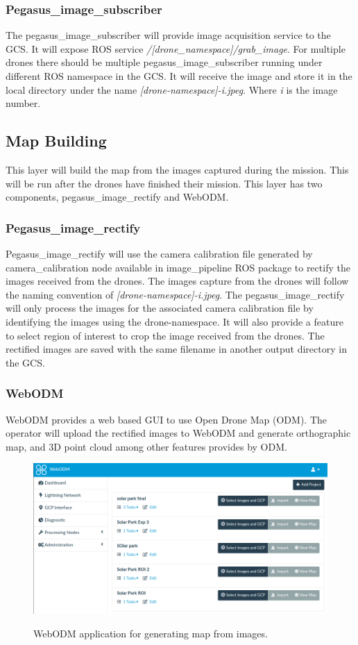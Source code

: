 \subsubsection{Pegasus\_image\_subscriber}

The pegasus\_image\_subscriber will provide image acquisition service to the GCS. It will expose ROS service \textit{/[drone\_namespace]/grab\_image}. For multiple drones there should be multiple pegasus\_image\_subscriber running under different ROS namespace in the GCS. It will receive the image and store it in the local directory under the name \textit{[drone-namespace]-i.jpeg}. Where \textit{i} is the image number.

\subsection{Map Building}
This layer will build the map from the images captured during the mission. This will be run after the drones have finished their mission. This layer has two components, pegasus\_image\_rectify and WebODM.

\subsubsection{Pegasus\_image\_rectify}
Pegasus\_image\_rectify will use the camera calibration file generated by camera\_calibration node available in image\_pipeline ROS package to rectify the images received from the drones. The images capture from the drones will follow the naming convention of \textit{[drone-namespace]-i.jpeg}. The pegasus\_image\_rectify will only process the images for the associated camera calibration file by identifying the images using the drone-namespace. It will also provide a feature to select region of interest to crop the image received from the drones. The rectified images are saved with the same filename in another output directory in the GCS.

\subsubsection{WebODM}
WebODM provides a web based GUI to use Open Drone Map (ODM). The operator will upload the rectified images to WebODM and generate orthographic map, and 3D point cloud among other features provides by ODM.
\begin{figure}
	\centering
	\caption[WebODM]{\small WebODM application for generating map from images.} 
	\includegraphics[width=6in]{figures/methodology/webodm}
	\label{fig:webodm}
\end{figure}

